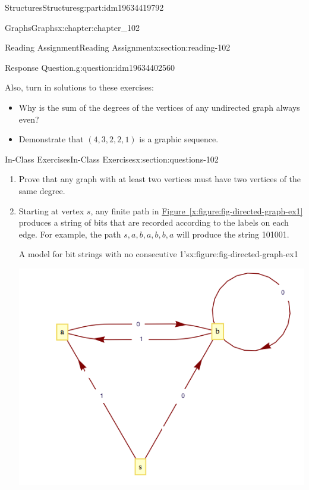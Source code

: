 \documentclass[oneside,10pt,]{book}
\newcommand{\xreffont}{\relax}
\numberwithin{equation}{section}
\begin{document}
\begin{partptx}{Structures}{}{Structures}{}{}{g:part:idm19634419792}
\begin{chapterptx}{Graphs}{}{Graphs}{}{}{x:chapter:chapter_102}
\begin{sectionptx}{Reading Assignment}{}{Reading Assignment}{}{}{x:section:reading-102}
\begin{question}{Response Question.}{g:question:idm19634402560}
\end{question}
Also, turn in solutions to these exercises:%
\begin{itemize}[label=\textbullet]
\item{}Why is the sum of the degrees of the vertices of any undirected graph always even?%
\item{}Demonstrate that \((4,3,2,2,1)\) is a graphic sequence.%
\end{itemize}
%
\end{sectionptx}
%
%
\typeout{************************************************}
\typeout{************************************************}
%
\begin{sectionptx}{In-Class Exercises}{}{In-Class Exercises}{}{}{x:section:questions-102}
%
\begin{enumerate}[label=\arabic*.]
\item{}Prove that any graph with at least two vertices must have two vertices of the same degree.%
\item{}Starting at vertex \(s\), any finite path in \hyperref[x:figure:fig-directed-graph-ex1]{Figure~{\xreffont\ref{x:figure:fig-directed-graph-ex1}}} produces a string of bits that are recorded according to the labels on each edge.  For example, the path \(s,a,b,a,b,b,a\) will produce the string 101001.%
\begin{figureptx}{A model for bit strings with no consecutive 1's}{x:figure:fig-directed-graph-ex1}{}%
\begin{image}{0.15}{0.7}{0.15}%
\includegraphics[width=\linewidth]{images/fig-directed-graph-ex1.png}

\end{image}
\end{figureptx}
\end{enumerate}
\end{sectionptx}
\end{chapterptx}
\end{partptx}
\end{document}
